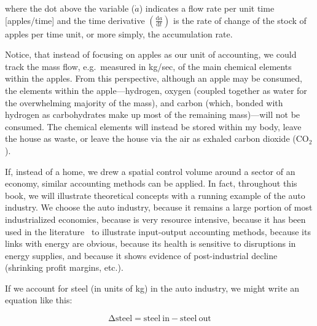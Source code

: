 \noindent{}where the dot above the variable ($\dot{a}$) indicates 
a flow rate per unit time [apples/time] and
the time derivative $\left( \frac{\mathrm{d}a}{\mathrm{d}t} \right)$ 
is the rate of change of the stock of apples per time unit, or more simply,
the accumulation rate.
 

Notice, that instead of focusing on apples as our unit of accounting, 
we could track the mass flow, e.g.\ measured in kg/sec, 
of the main chemical elements within the apples. 
From this perspective, although an apple may be consumed,
the elements within the apple---hydrogen, oxygen (coupled together as water
for the overwhelming majority of the mass), 
and carbon (which, bonded with hydrogen as carbohydrates make up most 
of the remaining mass)---will not be consumed. 
The chemical elements will instead be stored within my body, 
leave the house as waste, 
or leave the house via the air as exhaled carbon dioxide (CO$_2$).


If, instead of a home, we drew a spatial control volume 
around a sector of an economy, 
similar accounting methods can be applied. 
In fact, throughout this book, we will illustrate theoretical concepts with
a running example of the auto industry. 
We choose the auto industry,
because it remains a large portion of most industrialized economies, 
because is very resource intensive,
because it has been used in the literature~\cite{Bullard:1978vd}
to illustrate input-output accounting methods, 
because its links with energy are obvious,
because its health is sensitive to disruptions in energy supplies, and
because it shows evidence of post-industrial decline (shrinking profit margins, etc.).

If we account for steel (in units of kg) in the auto industry, 
we might write an equation like this:

\begin{equation}
	\mathrm{\Delta}\mathrm{steel} 
	= \mathrm{steel~in} 
	- \mathrm{steel~out} 
\end{equation}

